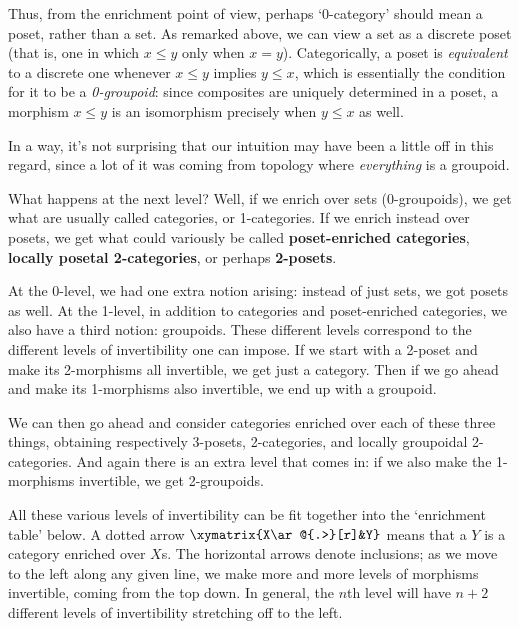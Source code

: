 \documentclass[12pt]{amsart}
\begin{document}
Thus, from the enrichment point of view, perhaps `0-category' should
mean a poset, rather than a set.  As remarked above, we can view a set
as a discrete poset (that is, one in which $x\le y$ only when $x=y$).
Categorically, a poset is \emph{equivalent} to a discrete one whenever
$x\le y$ implies $y\le x$, which is essentially the condition for it
to be a \emph{0-groupoid}: since composites are uniquely determined in
a poset, a morphism $x\le y$ is an isomorphism precisely when $y\le x$
as well.

In a way, it's not surprising that our intuition may have been a
little off in this regard, since a lot of it was coming from topology
where \emph{everything} is a groupoid.

What happens at the next level?  Well, if we enrich over sets
(0-groupoids), we get what are usually called categories, or
1-categories.  If we enrich instead over posets, we get what could
variously be called \textbf{poset-enriched categories}, \textbf{locally
  posetal 2-categories}, or perhaps \textbf{2-posets}.

At the 0-level, we had one extra notion arising: instead of just sets,
we got posets as well.  At the 1-level, in addition to categories and
poset-enriched categories, we also have a third notion: groupoids.
These different levels correspond to the different levels of
invertibility one can impose.  If we start with a 2-poset and make its
2-morphisms all invertible, we get just a category.  Then if we go
ahead and make its 1-morphisms also invertible, we end up with a
groupoid.

We can then go ahead and consider categories enriched over each of
these three things, obtaining respectively 3-posets, 2-categories, and
locally groupoidal 2-categories.  And again there is an extra level
that comes in: if we also make the 1-morphisms invertible, we get
2-groupoids.

All these various levels of invertibility can be fit together into the
`enrichment table' below.  A dotted arrow $\xymatrix{X\ar@{.>}[r]&Y}$
means that a $Y$ is a category enriched over $X$s.  The horizontal
arrows denote inclusions; as we move to the left along any given line,
we make more and more levels of morphisms invertible, coming from the
top down.  In general, the $n$th level will have $n+2$ different
levels of invertibility stretching off to the left.
\end{document}
